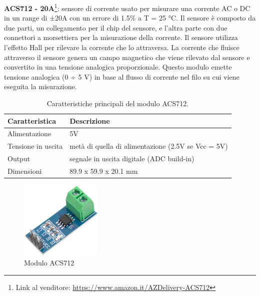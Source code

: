 %
\textbf{ACS712 - 20A}\footnote{Link al venditore: \href{https://www.amazon.it/AZDelivery-corrente-sensore-Current-Raspberry/dp/B0736DYV3W?th=1}{https://www.amazon.it/AZDelivery-ACS712}}: sensore di corrente usato per misurare una corrente AC o DC in un range di ±20A con un errore di 1.5\% a T = 25 °C. Il sensore è composto da due parti, un collegamento per il chip del sensore, e l'altra parte con due connettori a morsettiera per la misurazione della corrente.
Il sensore utilizza l'effetto Hall per rilevare la corrente che lo attraversa. La corrente che fluisce attraverso il sensore genera un campo magnetico che viene rilevato dal sensore e convertito in una tensione analogica proporzionale. Questo modulo emette tensione analogica (0 ÷ 5 V) in base al flusso di corrente nel filo su cui viene eseguita la misurazione.
%
\begin{table}[H]
    \centering
    \begin{tabular}{|l|l|}
    \hline
    \textbf{Caratteristica} & \textbf{Descrizione}                                \\ \hline
    Alimentazione           & 5V                                                  \\ \hline
    Tensione in uscita      & metà di quella di alimentazione (2.5V se Vcc = 5V) \\ \hline
    Output                  & segnale in uscita digitale (ADC build-in)           \\ \hline
    Dimensioni              & 89.9 x 59.9 x 20.1 mm                               \\ \hline
    \end{tabular}
    \caption{\label{acs712-features}Caratteristiche principali del modulo ACS712.}
\end{table}

\begin{figure}[H]
    \begin{center}
      \includegraphics[width=0.35\textwidth]{images/sensors/acs712.png}
    \end{center}
    \caption{Modulo ACS712}
\end{figure}

